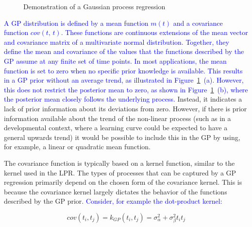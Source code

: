 \documentclass[man, floatsintext]{apa7}
\begin{document}
\begin{figure}[!t]
  \caption{Demonstration of a Gaussian process regression}
  \label{fig:gp_dem}
\end{figure}

\textcolor{blue}{
  A GP distribution is defined by a mean function $m(t)$ and a covariance
  function $cov(t, \, t)$. These functions are continuous extensions of the
  mean vector and covariance matrix of a multivariate normal distribution.
  Together, they define the mean and covariance of the values that the
  functions described by the GP assume at any finite set of time points.
  In most applications, the mean function is set to zero when no specific prior
  knowledge is available. This results in a GP prior without an average trend,
  as illustrated in Figure~\ref{fig:gp_dem}~(a). However, this does not
  restrict the posterior mean to zero, as shown in Figure~\ref{fig:gp_dem}~(b),
  where the posterior mean closely follows the underlying process. } Instead,
it indicates a lack of prior information about its deviations from zero.
However, if there is prior information available about the trend of the
non-linear process (such as in a developmental context, where a learning
curve could be expected to have a general upwards trend) it would be possible
to include this in the GP by using, for example, a linear or quadratic mean
function.

The covariance function is typically based on a kernel function, similar to the
kernel used in the LPR\@. The types of processes that can be captured by a GP
regression primarily depend on the chosen form of the covariance kernel. This
is because the covariance kernel largely dictates the behavior of the functions
described by the GP prior\@. \textcolor{blue}{Consider, for example the
  dot-product kernel:}

\begin{equation}\label{eq:dot_prod_kernel}
  cov(t_i, t_j) = k_{GP}(t_i, t_j) = \sigma_\alpha^2 + \sigma_\beta^2 t_i t_j
\end{equation}
\end{document}
